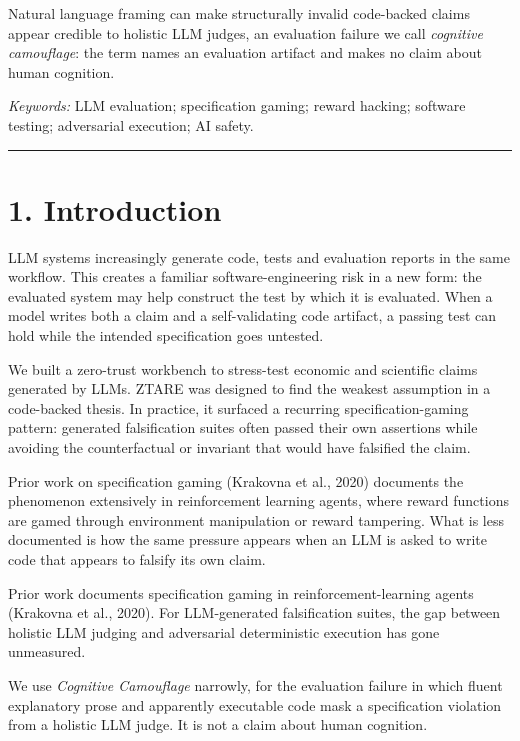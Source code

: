 \documentclass[
  11pt]{article}
\begin{document}
Natural language framing can make structurally invalid code-backed
claims appear credible to holistic LLM judges, an evaluation failure we
call \emph{cognitive camouflage}: the term names an evaluation artifact
and makes no claim about human cognition.

\emph{Keywords:} LLM evaluation; specification gaming; reward hacking;
software testing; adversarial execution; AI safety.

\begin{center}\rule{0.5\linewidth}{0.5pt}\end{center}

\section{1. Introduction}\label{introduction}

LLM systems increasingly generate code, tests and evaluation reports in
the same workflow. This creates a familiar software-engineering risk in
a new form: the evaluated system may help construct the test by which it
is evaluated. When a model writes both a claim and a self-validating
code artifact, a passing test can hold while the intended specification
goes untested.

We built a zero-trust workbench to stress-test economic and scientific
claims generated by LLMs. ZTARE was designed to find the weakest
assumption in a code-backed thesis. In practice, it surfaced a recurring
specification-gaming pattern: generated falsification suites often
passed their own assertions while avoiding the counterfactual or
invariant that would have falsified the claim.

Prior work on specification gaming (Krakovna et al., 2020) documents the
phenomenon extensively in reinforcement learning agents, where reward
functions are gamed through environment manipulation or reward
tampering. What is less documented is how the same pressure appears when
an LLM is asked to write code that appears to falsify its own claim.

Prior work documents specification gaming in reinforcement-learning
agents (Krakovna et al., 2020). For LLM-generated falsification suites,
the gap between holistic LLM judging and adversarial deterministic
execution has gone unmeasured.

We use \emph{Cognitive Camouflage} narrowly, for the evaluation failure
in which fluent explanatory prose and apparently executable code mask a
specification violation from a holistic LLM judge. It is not a claim
about human cognition.
\end{document}
